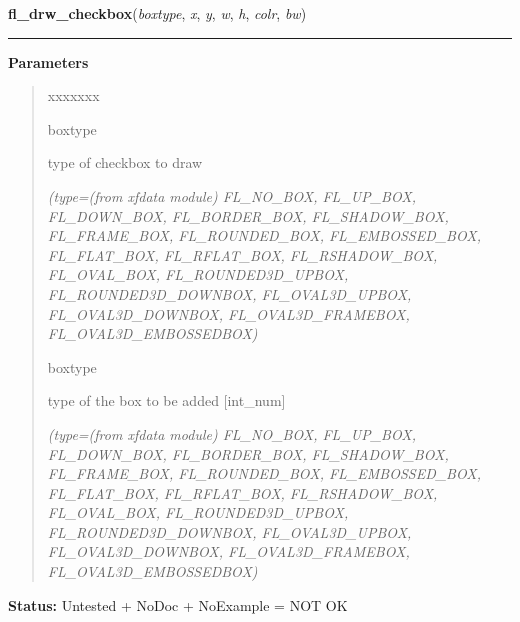     \label{xformslib:library:fl_drw_checkbox}

    \vspace{0.5ex}

\hspace{.8\funcindent}\begin{boxedminipage}{\funcwidth}

    \raggedright \textbf{fl\_drw\_checkbox}(\textit{boxtype}, \textit{x}, \textit{y}, \textit{w}, \textit{h}, \textit{colr}, \textit{bw})

    \vspace{-1.5ex}

    \rule{\textwidth}{0.5\fboxrule}
\setlength{\parskip}{2ex}
\setlength{\parskip}{1ex}
      \textbf{Parameters}
      \vspace{-1ex}

      \begin{quote}
        \begin{Ventry}{xxxxxxx}

          \item[boxtype]

          type of checkbox to draw

            {\it (type=(from xfdata module) FL\_NO\_BOX, FL\_UP\_BOX, FL\_DOWN\_BOX, 
FL\_BORDER\_BOX, FL\_SHADOW\_BOX, FL\_FRAME\_BOX, FL\_ROUNDED\_BOX, 
FL\_EMBOSSED\_BOX, FL\_FLAT\_BOX, FL\_RFLAT\_BOX, FL\_RSHADOW\_BOX, 
FL\_OVAL\_BOX, FL\_ROUNDED3D\_UPBOX, FL\_ROUNDED3D\_DOWNBOX, 
FL\_OVAL3D\_UPBOX, FL\_OVAL3D\_DOWNBOX, FL\_OVAL3D\_FRAMEBOX, 
FL\_OVAL3D\_EMBOSSEDBOX)}

          \item[boxtype]

          type of the box to be added [int\_num]

            {\it (type=(from xfdata module) FL\_NO\_BOX, FL\_UP\_BOX, FL\_DOWN\_BOX, 
FL\_BORDER\_BOX, FL\_SHADOW\_BOX, FL\_FRAME\_BOX, FL\_ROUNDED\_BOX, 
FL\_EMBOSSED\_BOX, FL\_FLAT\_BOX, FL\_RFLAT\_BOX, FL\_RSHADOW\_BOX, 
FL\_OVAL\_BOX, FL\_ROUNDED3D\_UPBOX, FL\_ROUNDED3D\_DOWNBOX, 
FL\_OVAL3D\_UPBOX, FL\_OVAL3D\_DOWNBOX, FL\_OVAL3D\_FRAMEBOX, 
FL\_OVAL3D\_EMBOSSEDBOX)}

        \end{Ventry}

      \end{quote}

\textbf{Status:} Untested + NoDoc + NoExample = NOT OK



    \end{boxedminipage}

